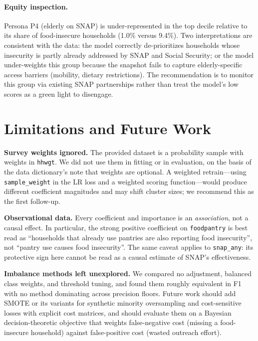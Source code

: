\documentclass[10pt,letterpaper]{article}
\begin{document}
\paragraph{Equity inspection.}
Persona P4 (elderly on SNAP) is under-represented in the top decile
relative to its share of food-insecure households (1.0\% versus
9.4\%).  Two interpretations are consistent with the data: the model
correctly de-prioritizes households whose insecurity is partly
already addressed by SNAP and Social Security; or the model
under-weights this group because the snapshot fails to capture
elderly-specific access barriers (mobility, dietary restrictions).
The recommendation is to monitor this group via existing SNAP
partnerships rather than treat the model's low scores as a green
light to disengage.

\section{Limitations and Future Work}
\label{sec:limits}

\textbf{Survey weights ignored.} The provided dataset is a probability
sample with weights in \texttt{hhwgt}.  We did not use them in fitting
or in evaluation, on the basis of the data dictionary's note that
weights are optional.  A weighted retrain---using \texttt{sample\_weight}
in the LR loss and a weighted scoring function---would produce
different coefficient magnitudes and may shift cluster sizes; we
recommend this as the first follow-up.

\textbf{Observational data.} Every coefficient and importance is an
\emph{association}, not a causal effect.  In particular, the
strong positive coefficient on \texttt{foodpantry} is best read as
``households that already use pantries are also reporting food
insecurity'', not ``pantry use causes food insecurity''.  The same
caveat applies to \texttt{snap\_any}: its protective sign here cannot
be read as a causal estimate of SNAP's effectiveness.

\textbf{Imbalance methods left unexplored.} We compared no adjustment,
balanced class weights, and threshold tuning, and found them roughly
equivalent in F1 with no method dominating across precision floors.
Future work should add SMOTE or its variants for synthetic minority
oversampling and cost-sensitive losses with explicit cost matrices, and
should evaluate them on a Bayesian decision-theoretic objective that
weights false-negative cost (missing a food-insecure household)
against false-positive cost (wasted outreach effort).
\end{document}
